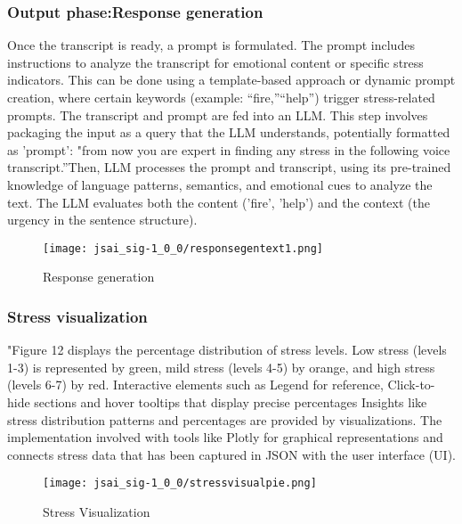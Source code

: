 \documentclass[a4j, twocolumn]{article}
\begin{document}
\subsubsection{Output phase:Response generation} %
Once the transcript is ready, a prompt is formulated. The prompt includes instructions to analyze the transcript for emotional content or specific stress indicators. This can be done using a template-based approach or dynamic prompt creation, where certain keywords (example: “fire,”“help”) trigger stress-related prompts. The transcript and prompt are fed into an LLM. This step involves packaging the input as a query that the LLM understands, potentially formatted as 'prompt': "from now you are expert in finding any stress in the following voice transcript.”Then, LLM processes the prompt and transcript, using its pre-trained knowledge of language patterns, semantics, and emotional cues to analyze the text. The LLM evaluates both the content ('fire', 'help') and the context (the urgency in the sentence structure).
\vspace{10pt} %
 \begin{figure}[H] %
    \centering
    \texttt{[image: jsai\_sig-1\_0\_0/responsegentext1.png]}
    \caption{Response generation}
    \label{fig:system_architecture}
\end{figure}
   \FloatBarrier %
  \subsubsection{ Stress visualization}
"Figure 12 displays the percentage distribution of stress levels. Low stress (levels 1-3) is represented by green, mild stress (levels 4-5) by orange, and high stress (levels 6-7) by red. Interactive elements such as Legend for reference, Click-to-hide sections and hover tooltips that display precise percentages Insights like stress distribution patterns and percentages are provided by visualizations.  The implementation involved with tools like Plotly for graphical representations and connects stress data that has been captured in JSON with the user interface (UI). 
\vspace{5pt} %
\begin{figure}[htbp] %
    \centering
    \texttt{[image: jsai\_sig-1\_0\_0/stressvisualpie.png]}
    \caption{Stress Visualization}
    \label{fig:stress_visualization}
\end{figure}
\vspace{5pt} %
  \FloatBarrier
\end{document}
